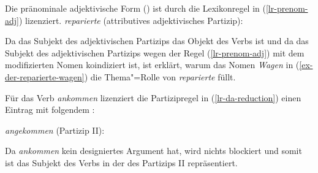 {Die pränominale adjektivische Form () ist durch die Lexikonregel in (\ref{lr-prenom-adj})
lizenziert.
\eas
{\em reparierte} (attributives adjektivisches Partizip):\\
\zs

\noindent
Da das Subjekt des adjektivischen Partizips das Objekt des Verbs ist und
da das Subjekt des adjektivischen Partizips wegen der Regel (\ref{lr-prenom-adj})
mit dem modifizierten Nomen koindiziert ist, ist erklärt, warum das Nomen \emph{Wagen} 
in (\ref{ex-der-reparierte-wagen}) die Thema"=Rolle von \emph{reparierte} füllt.

Für das Verb \emph{ankommen} lizenziert die Partizipregel in (\ref{lr-da-reduction}) einen Eintrag
mit folgendem \localw:

\eas
\emph{angekommen} (Partizip II):\\
\zs

\noindent
Da \emph{ankommen} kein designiertes Argument hat, wird nichts blockiert und somit ist das Subjekt des
Verbs in der \subcatl des Partizips II repräsentiert.

}
